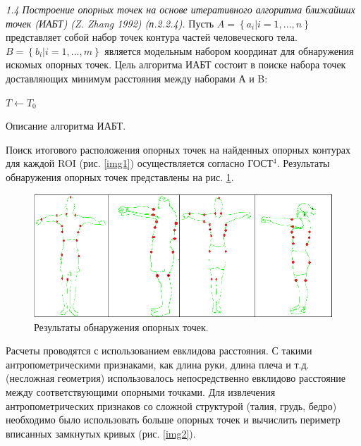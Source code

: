 \textit{1.4 Построение опорных точек на основе итеративного алгоритма ближайших точек (ИАБТ) (Z. Zhang 1992) (п.2.2.4).} Пусть $A=\left\{a_i| i=1, ..., n\right\}$ представляет собой набор точек контура частей человеческого тела. $B=\left\{b_i| i=1, ..., m\right\}$ является модельным набором координат для обнаружения искомых опорных точек. Цель алгоритма ИАБТ состоит в поиске набора точек доставляющих минимум расстояния между наборами А и B:

\begin{algorithm}[ht!]
  $T\leftarrow T_0$\;
  \caption{Описание алгоритма ИАБТ.}
\end{algorithm}

Поиск итогового расположения опорных точек на найденных опорных контурах для каждой ROI (рис. \ref{img1}) осуществляется согласно ГОСТ$^4$. Результаты обнаружения опорных точек представлены на рис. \ref{img7}.
\begin{figure}[ht!]
\centering
\includegraphics [width=0.9\linewidth] {images/h18.png}
\begin{center}
\caption{Результаты обнаружения опорных точек.} \label{img7}
\end{center}
\end{figure}
Расчеты проводятся с использованием евклидова расстояния. С такими антропометрическими признаками, как длина руки, длина плеча и т.д. (несложная геометрия) использовалось непосредственно евклидово расстояние между соответствующими опорными точками. Для извлечения антропометрических признаков со сложной структурой (талия, грудь, бедро) необходимо было использовать больше опорных точек и вычислить периметр вписанных замкнутых кривых (рис. \ref{img2}).

